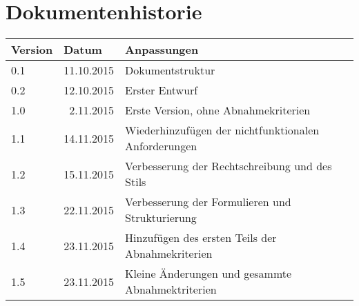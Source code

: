 \section*{Dokumentenhistorie}
\begin{tabularx}{\linewidth}{|l|r|X|} \hline
Version & \multicolumn{1}{l|}{Datum} 			& Anpassungen \\ \hline
0.1 & 11.10.2015 & Dokumentstruktur \\ \hline
0.2	& 12.10.2015 & Erster Entwurf  \\ \hline
1.0 &  2.11.2015 & Erste Version, ohne Abnahmekriterien \\ \hline
1.1 & 14.11.2015 & Wiederhinzufügen der nichtfunktionalen Anforderungen \\ \hline
1.2 & 15.11.2015 & Verbesserung der Rechtschreibung und des Stils \\ \hline
1.3 & 22.11.2015 & Verbesserung der Formulieren und Strukturierung\\ \hline
1.4 & 23.11.2015 & Hinzufügen des ersten Teils der Abnahmekriterien\\ \hline
1.5 & 23.11.2015 & Kleine Änderungen und gesammte Abnahmektriterien\\ \hline
\end{tabularx}
